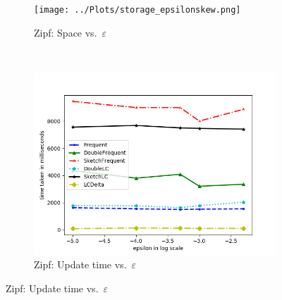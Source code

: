 \documentclass[sigconf,review=true,anonymous=true,screen]{acmart}
\newcommand{\eps}{\varepsilon}
\begin{document}
\begin{figure}[!h]
\centering
\begin{subfigure}[b]{0.3\textwidth}
\texttt{[image: ../Plots/storage\_epsilonskew.png]}
\caption{Zipf: Space vs.~$\eps$}
\label{fig:zipspeps}
\end{subfigure}
~
\begin{subfigure}[b]{0.3\textwidth}
\includegraphics[width=\textwidth]{../Plots/time_epsilonskew.png}
\caption{Zipf: Update time vs.~$\eps$}
\label{fig:ziptimeps}
\end{subfigure}


\end{figure}
\end{document}
